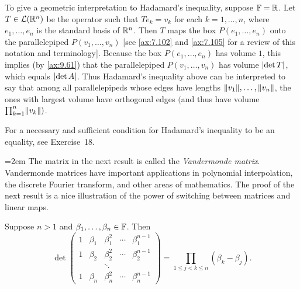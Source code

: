 To give a geometric interpretation to Hadamard's inequality, suppose $\mathbb{F}=\mathbb{R}$.
Let $T\in\mathcal{L}(\mathbb{R}^n)$ be the operator such that $Te_k=v_k$ for each
$k=1,\dots,n$, where $e_1,\dots,e_n$ is the standard basis of $\mathbb{R}^n$. Then $T$
maps the box $P(e_1,\dots,e_n)$ onto the parallelepiped $P(v_1,\dots,v_n)$
[see \ref{ax:7.102} and \ref{ax:7.105} for a review of this notation and
terminology]. Because the box $P(e_1,\dots,e_n)$ has volume $1$, this implies
(by \ref{ax:9.61}) that the parallelepiped $P(v_1,\dots,v_n)$ has volume
$\lvert \operatorname{det} T \rvert$, which equals $\lvert \operatorname{det} A \rvert$. Thus Hadamard's inequality above
can be interpreted to say that among all parallelepipeds whose edges have
lengths $\lVert v_1 \rVert,\dots,\lVert v_n \rVert$, the ones with largest volume have
orthogonal edges $($and thus have volume
$\prod_{k=1}^n\lVert v_k \rVert)$.

For a necessary and sufficient condition for Hadamard's inequality to be an
equality, see Exercise~18.

\begingroup\emergencystretch=2em
The matrix in the next result is called the \emph{Vandermonde matrix}.
Vandermonde matrices have important applications in polynomial interpolation,
the discrete Fourier transform, and other areas of mathematics. The proof of
the next result is a nice illustration of the power of switching between
matrices and linear maps.\par\endgroup

\begin{result}\label{ax:9.67}
Suppose $n>1$ and $\beta_1,\dots,\beta_n\in\mathbb{F}$. Then
\[ \det\begin{pmatrix}
     1 & \beta_1 & \beta_1^2 & \cdots & \beta_1^{n-1}\\
     1 & \beta_2 & \beta_2^2 & \cdots & \beta_2^{n-1}\\
       &         & \ddots    &        &              \\
     1 & \beta_n & \beta_n^2 & \cdots & \beta_n^{n-1}
   \end{pmatrix}
   = \prod_{1\le j<k\le n}(\beta_k-\beta_j). \]
\end{result}

